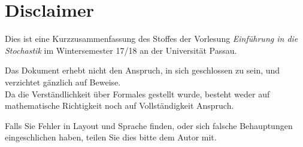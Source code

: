 \section*{Disclaimer}
\thispagestyle{empty}

Dies ist eine Kurzzusammenfassung des Stoffes der Vorlesung
\textit{Einführung in die Stochastik} im Wintersemester 17/18 an der Universität Passau.

Das Dokument erhebt nicht den Anspruch, in sich geschlossen zu sein, und verzichtet
gänzlich auf Beweise.\\
Da die Verständlichkeit über Formales gestellt wurde, besteht weder auf mathematische
Richtigkeit noch auf Vollständigkeit Anspruch.


Falls Sie Fehler in Layout und Sprache finden, oder sich falsche Behauptungen
eingeschlichen haben, teilen Sie dies bitte dem Autor mit.
